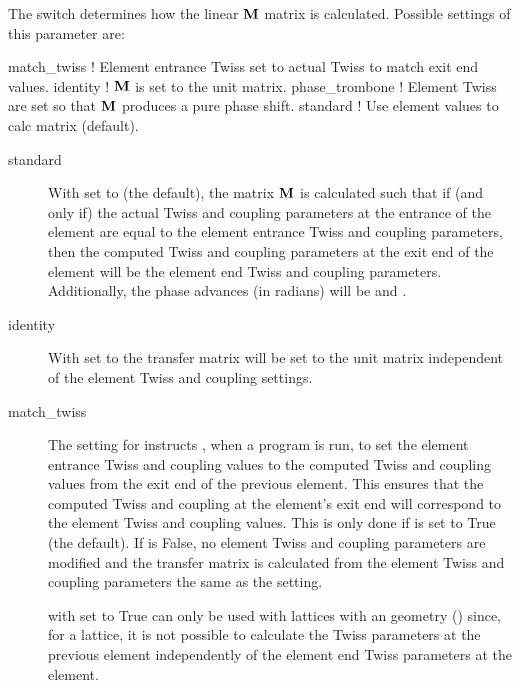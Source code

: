 {The  switch determines how the linear ${\bf M}$ matrix is calculated. Possible settings of this
parameter are:
\begin{example}
  match_twiss      ! Element entrance Twiss set to actual Twiss to match exit end values.
  identity         ! \({\bf M}\) is set to the unit matrix.
  phase_trombone   ! Element Twiss are set so that \({\bf M}\) produces a pure phase shift.
  standard         ! Use element values to calc matrix (default).
\end{example}
%
\begin{description} 
%
\item[standard] \Newline
With  set to  (the default), the matrix ${\bf M}$ is calculated such that if
(and only if) the actual Twiss and coupling parameters at the entrance of the  element
are equal to the element entrance Twiss and coupling parameters, then the computed Twiss and
coupling parameters at the exit end of the  element will be the element end Twiss and coupling
parameters. Additionally, the phase advances (in radians) will be  and .
%
\item[identity] \Newline
With  set to  the transfer matrix will be set to the unit matrix independent
of the element Twiss and coupling settings.
%
\item[match_twiss] \Newline
The  setting for  instructs \bmad, when a program is run, to set the
element entrance Twiss and coupling values to the computed Twiss and coupling values from the exit
end of the previous element. This ensures that the computed Twiss and coupling at the element's exit end
will correspond to the element Twiss and coupling values. This is only done if  is set to
True (the default). If  is False, no element Twiss and coupling parameters are modified
and the transfer matrix is calculated from the element Twiss and coupling parameters the same as the
 setting.

 with  set to True can only be used with lattices with an 
geometry () since, for a  lattice, it is not possible to calculate the
Twiss parameters at the previous element independently of the element end Twiss parameters at the
 element.


\end{description}}
